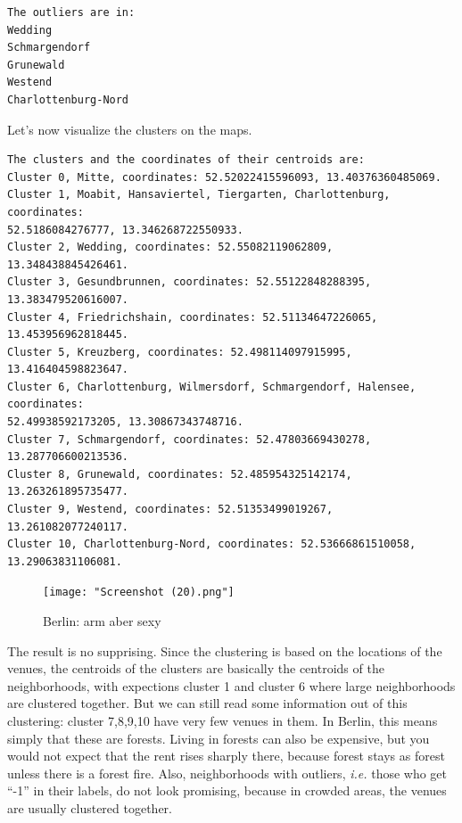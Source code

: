 \documentclass[11pt]{article}
\begin{document}
    

    \begin{Verbatim}[commandchars=\\\{\}]
The outliers are in:
Wedding
Schmargendorf
Grunewald
Westend
Charlottenburg-Nord
    \end{Verbatim}

    Let's now visualize the clusters on the maps.

   

    \begin{Verbatim}[commandchars=\\\{\}]
The clusters and the coordinates of their centroids are:
Cluster 0, Mitte, coordinates: 52.52022415596093, 13.40376360485069.
Cluster 1, Moabit, Hansaviertel, Tiergarten, Charlottenburg, coordinates:
52.5186084276777, 13.346268722550933.
Cluster 2, Wedding, coordinates: 52.55082119062809, 13.348438845426461.
Cluster 3, Gesundbrunnen, coordinates: 52.55122848288395, 13.383479520616007.
Cluster 4, Friedrichshain, coordinates: 52.51134647226065, 13.453956962818445.
Cluster 5, Kreuzberg, coordinates: 52.498114097915995, 13.416404598823647.
Cluster 6, Charlottenburg, Wilmersdorf, Schmargendorf, Halensee, coordinates:
52.49938592173205, 13.30867343748716.
Cluster 7, Schmargendorf, coordinates: 52.47803669430278, 13.287706600213536.
Cluster 8, Grunewald, coordinates: 52.485954325142174, 13.263261895735477.
Cluster 9, Westend, coordinates: 52.51353499019267, 13.261082077240117.
Cluster 10, Charlottenburg-Nord, coordinates: 52.53666861510058,
13.29063831106081.
    \end{Verbatim}

            \begin{figure}
\centering
\texttt{[image: "Screenshot (20).png"]}
\caption{Berlin: arm aber sexy}
\end{figure}


        
    The result is no supprising. Since the clustering is based on the
locations of the venues, the centroids of the clusters are basically the
centroids of the neighborhoods, with expections cluster 1 and cluster 6
where large neighborhoods are clustered together. But we can still read
some information out of this clustering: cluster 7,8,9,10 have very few
venues in them. In Berlin, this means simply that these are forests.
Living in forests can also be expensive, but you would not expect that
the rent rises sharply there, because forest stays as forest unless
there is a forest fire. Also, neighborhoods with outliers, \emph{i.e.}
those who get ``-1'' in their labels, do not look promising, because in
crowded areas, the venues are usually clustered together.
\end{document}
